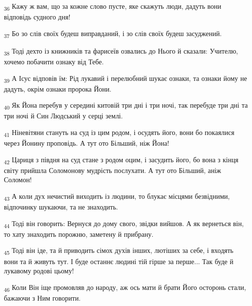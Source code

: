 \begin{tcolorbox}
\textsubscript{36} Кажу ж вам, що за кожне слово пусте, яке скажуть люди, дадуть вони відповідь судного дня!
\end{tcolorbox}
\begin{tcolorbox}
\textsubscript{37} Бо зо слів своїх будеш виправданий, і зо слів своїх будеш засуджений.
\end{tcolorbox}
\begin{tcolorbox}
\textsubscript{38} Тоді дехто із книжників та фарисеїв озвались до Нього й сказали: Учителю, хочемо побачити ознаку від Тебе.
\end{tcolorbox}
\begin{tcolorbox}
\textsubscript{39} А Ісус відповів їм: Рід лукавий і перелюбний шукає ознаки, та ознаки йому не дадуть, окрім ознаки пророка Йони.
\end{tcolorbox}
\begin{tcolorbox}
\textsubscript{40} Як Йона перебув у середині китовій три дні і три ночі, так перебуде три дні та три ночі й Син Людський у серці землі.
\end{tcolorbox}
\begin{tcolorbox}
\textsubscript{41} Ніневітяни стануть на суд із цим родом, і осудять його, вони бо покаялися через Йонину проповідь. А тут ото Більший, ніж Йона!
\end{tcolorbox}
\begin{tcolorbox}
\textsubscript{42} Цариця з півдня на суд стане з родом оцим, і засудить його, бо вона з кінця світу прийшла Соломонову мудрість послухати. А тут ото Більший, аніж Соломон!
\end{tcolorbox}
\begin{tcolorbox}
\textsubscript{43} А коли дух нечистий виходить із людини, то блукає місцями безвідними, відпочинку шукаючи, та не знаходить.
\end{tcolorbox}
\begin{tcolorbox}
\textsubscript{44} Тоді він говорить: Вернуся до дому свого, звідки вийшов. А як вернеться він, то хату знаходить порожню, заметену й прибрану.
\end{tcolorbox}
\begin{tcolorbox}
\textsubscript{45} Тоді він іде, та й приводить сімох духів інших, лютіших за себе, і входять вони та й живуть тут. І буде останнє людині тій гірше за перше... Так буде й лукавому родові цьому!
\end{tcolorbox}
\begin{tcolorbox}
\textsubscript{46} Коли Він іще промовляв до народу, аж ось мати й брати Його осторонь стали, бажаючи з Ним говорити.
\end{tcolorbox}
